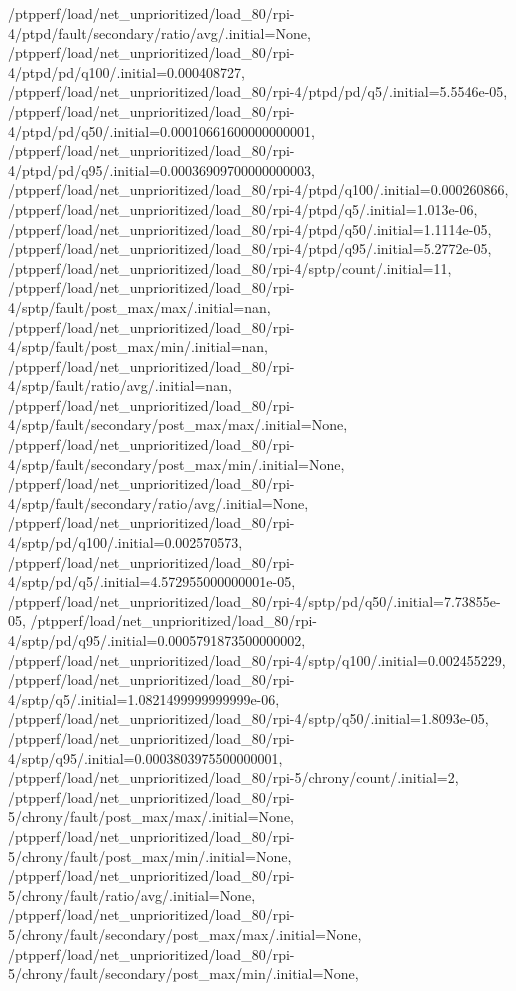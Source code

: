 {    /ptpperf/load/net_unprioritized/load_80/rpi-4/ptpd/fault/secondary/ratio/avg/.initial=None,
    /ptpperf/load/net_unprioritized/load_80/rpi-4/ptpd/pd/q100/.initial=0.000408727,
    /ptpperf/load/net_unprioritized/load_80/rpi-4/ptpd/pd/q5/.initial=5.5546e-05,
    /ptpperf/load/net_unprioritized/load_80/rpi-4/ptpd/pd/q50/.initial=0.00010661600000000001,
    /ptpperf/load/net_unprioritized/load_80/rpi-4/ptpd/pd/q95/.initial=0.00036909700000000003,
    /ptpperf/load/net_unprioritized/load_80/rpi-4/ptpd/q100/.initial=0.000260866,
    /ptpperf/load/net_unprioritized/load_80/rpi-4/ptpd/q5/.initial=1.013e-06,
    /ptpperf/load/net_unprioritized/load_80/rpi-4/ptpd/q50/.initial=1.1114e-05,
    /ptpperf/load/net_unprioritized/load_80/rpi-4/ptpd/q95/.initial=5.2772e-05,
    /ptpperf/load/net_unprioritized/load_80/rpi-4/sptp/count/.initial=11,
    /ptpperf/load/net_unprioritized/load_80/rpi-4/sptp/fault/post_max/max/.initial=nan,
    /ptpperf/load/net_unprioritized/load_80/rpi-4/sptp/fault/post_max/min/.initial=nan,
    /ptpperf/load/net_unprioritized/load_80/rpi-4/sptp/fault/ratio/avg/.initial=nan,
    /ptpperf/load/net_unprioritized/load_80/rpi-4/sptp/fault/secondary/post_max/max/.initial=None,
    /ptpperf/load/net_unprioritized/load_80/rpi-4/sptp/fault/secondary/post_max/min/.initial=None,
    /ptpperf/load/net_unprioritized/load_80/rpi-4/sptp/fault/secondary/ratio/avg/.initial=None,
    /ptpperf/load/net_unprioritized/load_80/rpi-4/sptp/pd/q100/.initial=0.002570573,
    /ptpperf/load/net_unprioritized/load_80/rpi-4/sptp/pd/q5/.initial=4.572955000000001e-05,
    /ptpperf/load/net_unprioritized/load_80/rpi-4/sptp/pd/q50/.initial=7.73855e-05,
    /ptpperf/load/net_unprioritized/load_80/rpi-4/sptp/pd/q95/.initial=0.0005791873500000002,
    /ptpperf/load/net_unprioritized/load_80/rpi-4/sptp/q100/.initial=0.002455229,
    /ptpperf/load/net_unprioritized/load_80/rpi-4/sptp/q5/.initial=1.0821499999999999e-06,
    /ptpperf/load/net_unprioritized/load_80/rpi-4/sptp/q50/.initial=1.8093e-05,
    /ptpperf/load/net_unprioritized/load_80/rpi-4/sptp/q95/.initial=0.0003803975500000001,
    /ptpperf/load/net_unprioritized/load_80/rpi-5/chrony/count/.initial=2,
    /ptpperf/load/net_unprioritized/load_80/rpi-5/chrony/fault/post_max/max/.initial=None,
    /ptpperf/load/net_unprioritized/load_80/rpi-5/chrony/fault/post_max/min/.initial=None,
    /ptpperf/load/net_unprioritized/load_80/rpi-5/chrony/fault/ratio/avg/.initial=None,
    /ptpperf/load/net_unprioritized/load_80/rpi-5/chrony/fault/secondary/post_max/max/.initial=None,
    /ptpperf/load/net_unprioritized/load_80/rpi-5/chrony/fault/secondary/post_max/min/.initial=None,
}

